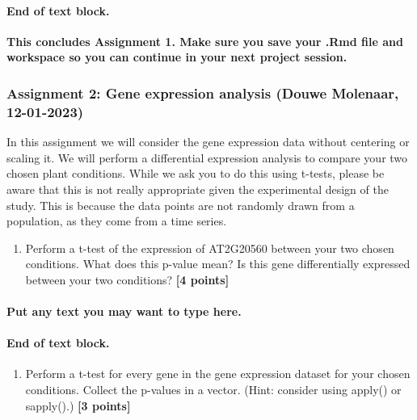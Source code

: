\documentclass[
]{article}
\providecommand{\tightlist}{%
  \setlength{\itemsep}{0pt}\setlength{\parskip}{0pt}}
\begin{document}
\hypertarget{end-of-text-block.-6}{%
\paragraph{\texorpdfstring{End of text block.\\
}{End of text block. }}\label{end-of-text-block.-6}}

\hfill\break
\textbf{This concludes Assignment 1. Make sure you save your .Rmd file
and workspace so you can continue in your next project session.}

\hypertarget{assignment-2-gene-expression-analysis-douwe-molenaar-12-01-2023}{%
\subsubsection{Assignment 2: Gene expression analysis (Douwe Molenaar,
12-01-2023)}\label{assignment-2-gene-expression-analysis-douwe-molenaar-12-01-2023}}

In this assignment we will consider the gene expression data without
centering or scaling it. We will perform a differential expression
analysis to compare your two chosen plant conditions. While we ask you
to do this using t-tests, please be aware that this is not really
appropriate given the experimental design of the study. This is because
the data points are not randomly drawn from a population, as they come
from a time series.

\begin{enumerate}
\def\labelenumi{\Alph{enumi})}
\tightlist
\item
  Perform a t-test of the expression of AT2G20560 between your two
  chosen conditions. What does this p-value mean? Is this gene
  differentially expressed between your two conditions? \textbf{{[}4
  points{]}}
\end{enumerate}

\hypertarget{put-any-text-you-may-want-to-type-here.-5}{%
\paragraph{Put any text you may want to type
here.}\label{put-any-text-you-may-want-to-type-here.-5}}

\hypertarget{end-of-text-block.-7}{%
\paragraph{End of text block.}\label{end-of-text-block.-7}}

\begin{enumerate}
\def\labelenumi{\Alph{enumi})}
\setcounter{enumi}{1}
\tightlist
\item
  Perform a t-test for every gene in the gene expression dataset for
  your chosen conditions. Collect the p-values in a vector. (Hint:
  consider using apply() or sapply().) \textbf{{[}3 points{]}}
\end{enumerate}
\end{document}
